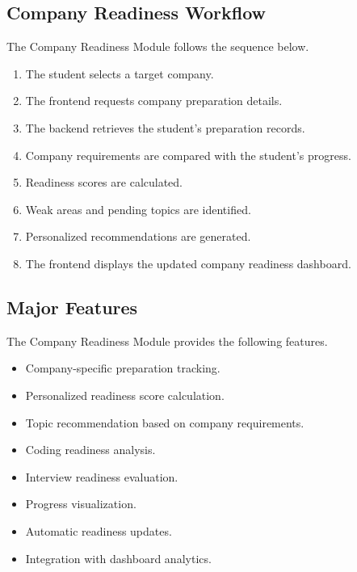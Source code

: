 \subsection{Company Readiness Workflow}

The Company Readiness Module follows the sequence below.

\begin{enumerate}

\item The student selects a target company.

\item The frontend requests company preparation details.

\item The backend retrieves the student's preparation records.

\item Company requirements are compared with the student's progress.

\item Readiness scores are calculated.

\item Weak areas and pending topics are identified.

\item Personalized recommendations are generated.

\item The frontend displays the updated company readiness dashboard.

\end{enumerate}

\subsection{Major Features}

The Company Readiness Module provides the following features.

\begin{itemize}

\item Company-specific preparation tracking.

\item Personalized readiness score calculation.

\item Topic recommendation based on company requirements.

\item Coding readiness analysis.

\item Interview readiness evaluation.

\item Progress visualization.

\item Automatic readiness updates.

\item Integration with dashboard analytics.

\end{itemize}

